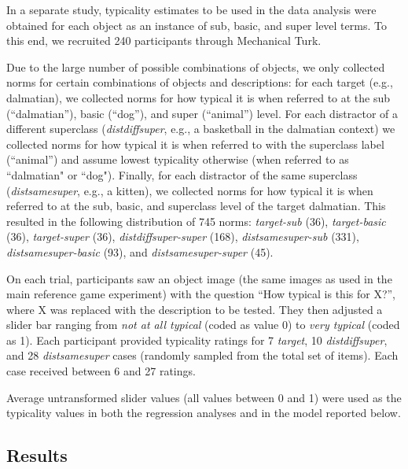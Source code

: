\documentclass[10pt,letterpaper]{article}
\newcommand{\jd}[1]{\textcolor{Blue}{[jd: #1]}}
\newcommand{\ndg}[1]{\textcolor{Green}{[ndg: #1]}}
\begin{document}
In a separate study, typicality estimates to be used in the data analysis were obtained for each object as an instance of sub, basic, and super level terms. To this end, we recruited 240 participants through Mechanical Turk.

Due to the large number of possible combinations of objects, we only collected norms for certain combinations of objects and descriptions: for each target (e.g., dalmatian), we collected norms for how typical it is when referred to at the sub (``dalmatian''), basic (``dog''), and super (``animal'') level. For each distractor of a different superclass (\emph{distdiffsuper}, e.g., a basketball in the dalmatian context) we collected norms for how typical it is when referred to with the superclass label (``animal'') and assume lowest typicality otherwise (when referred to as ``dalmatian" or ``dog"). Finally, for each distractor of the same superclass (\emph{distsamesuper}, e.g., a kitten), we collected norms for how typical it is when referred to at the sub, basic, and superclass level of the target dalmatian. This resulted in the following distribution of 745 norms:  \emph{target-sub} (36), \emph{target-basic} (36), \emph{target-super} (36), \emph{distdiffsuper-super} (168), \emph{distsamesuper-sub} (331), \emph{distsamesuper-basic} (93), and \emph{distsamesuper-super} (45). 

On each trial, participants saw an object image (the same images as used in the main reference game experiment) with the question ``How typical is this for X?'', where X was replaced with the description to be tested. They then adjusted a slider bar ranging from \emph{not at all typical} (coded as value 0) to \emph{very typical} (coded as 1). Each participant provided typicality ratings for 7 \emph{target}, 10 \emph{distdiffsuper}, and 28 \emph{distsamesuper} cases (randomly sampled from the total set of items). Each case received between 6 and 27 ratings. 

Average untransformed slider values (all values between 0 and 1) were used as the typicality values in both the regression analyses and in  the model reported below.



\subsection{\bf Results}
\end{document}
